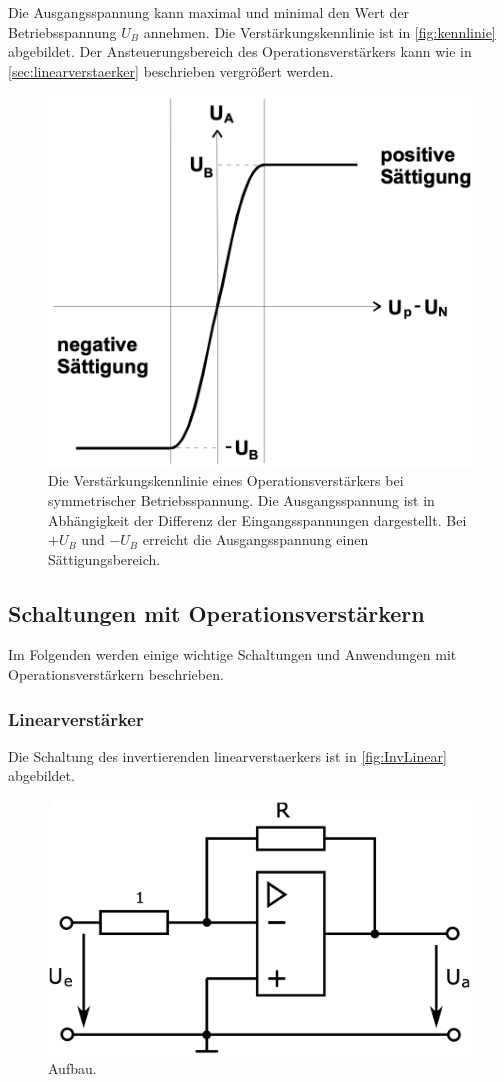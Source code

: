 
Die Ausgangsspannung kann maximal und minimal den Wert der Betriebsspannung $U_B$ annehmen. Die Verstärkungskennlinie ist in \autoref{fig:kennlinie} abgebildet. Der Ansteuerungsbereich des Operationsverstärkers kann wie in \autoref{sec:linearverstaerker} beschrieben vergrößert werden.

\begin{figure}
    \centering
    \includegraphics[width=0.5\linewidth]{./figures/Kennlinie.png}
    \caption{Die Verstärkungskennlinie eines Operationsverstärkers bei symmetrischer Betriebsspannung. Die Ausgangsspannung ist in Abhängigkeit der Differenz der Eingangsspannungen dargestellt. Bei $+U_B$ und $-U_B$ erreicht die Ausgangsspannung einen Sättigungsbereich.} %
    \label{fig:kennlinie}
\end{figure}



\newpage
\subsection{Schaltungen mit Operationsverstärkern}
\label{sec:Schaltungen}

Im Folgenden werden einige wichtige Schaltungen und Anwendungen mit Operationsverstärkern beschrieben.

\subsubsection{Linearverstärker}
\label{sec:linearverstaerker}
Die Schaltung des invertierenden linearverstaerkers ist in \autoref{fig:InvLinear} abgebildet.

\begin{figure}
    \centering
    \includegraphics[width=0.7\linewidth]{./figures/1_InvLinear.png}
    \caption{Aufbau. \cite{Anleitung}} %
    \label{fig:InvLinear}
\end{figure}

